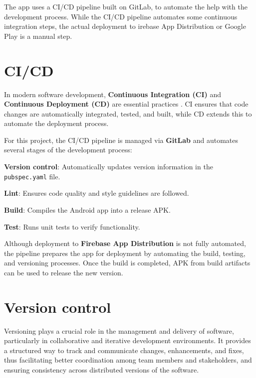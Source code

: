 \documentclass[
  digital,     %
  oneside,     %
  nosansbold,  %
  nocolorbold, %
  lof,         %
  lot,         %
]{fithesis4}
\begin{document}
The app uses a \gls{CI}/\gls{CD} pipeline built on GitLab, to automate the help with the development process.  While the \gls{CI}/\gls{CD} pipeline automates some continuous integration steps, the actual deployment to irebase App Distribution or Google Play is a manual step.

\section{CI/CD}

In modern software development, \textbf{Continuous Integration (\gls{CI})} and \textbf{Continuous Deployment (\gls{CD})} are essential practices \cite{gitlabCI}. \gls{CI} ensures that code changes are automatically integrated, tested, and built, while \gls{CD} extends this to automate the deployment process.

For this project, the \gls{CI}/\gls{CD} pipeline is managed via \textbf{GitLab} and automates several stages of the development process:

\begin{compactitem}
  \item \textbf{Version control}: Automatically updates version information in the \texttt{pubspec.yaml} file.
  \item \textbf{Lint}: Ensures code quality and style guidelines are followed.
  \item \textbf{Build}: Compiles the Android app into a release \gls{APK}.
  \item \textbf{Test}: Runs unit tests to verify functionality.
\end{compactitem}

\vspace{\baselineskip}

Although deployment to \textbf{Firebase App Distribution} is not fully automated, the pipeline prepares the app for deployment by automating the build, testing, and versioning processes. Once the build is completed, \gls{APK} from build artifacts can be used to release the new version.

\section{Version control}

Versioning plays a crucial role in the management and delivery of software, particularly in collaborative and iterative development environments. It provides a structured way to track and communicate changes, enhancements, and fixes, thus facilitating better coordination among team members and stakeholders, and ensuring consistency across distributed versions of the software.
\end{document}
